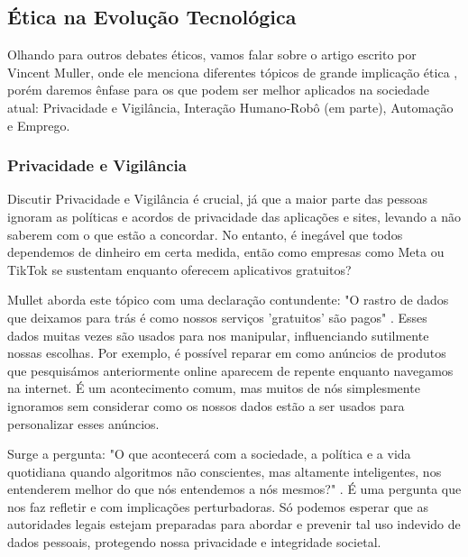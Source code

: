\documentclass[referee,sn-basic]{sn-jnl}
\theoremstyle{thmstyleone}%
\begin{document}
\subsection{Ética na Evolução Tecnológica}
\hspace{0.7cm}Olhando para outros debates éticos, vamos falar sobre o artigo escrito por Vincent Muller, onde ele menciona diferentes tópicos de grande implicação ética \cite{sep-ethics-ai}, porém daremos ênfase para os que podem ser melhor aplicados na sociedade atual: Privacidade e Vigilância, Interação Humano-Robô (em parte), Automação e Emprego.


\subsubsection{Privacidade e Vigilância}
\hspace{0.7cm}Discutir Privacidade e Vigilância é crucial, já que a maior parte das pessoas ignoram as políticas e acordos de privacidade das aplicações e sites, levando a não saberem com o que estão a concordar. No entanto, é inegável que todos dependemos de dinheiro em certa medida, então como empresas como Meta ou TikTok se sustentam enquanto oferecem aplicativos gratuitos?\par

 Mullet aborda este tópico com uma declaração contundente: "O rastro de dados que deixamos para trás é como nossos serviços 'gratuitos' são pagos" \cite{sep-ethics-ai}. Esses dados muitas vezes são usados para nos manipular, influenciando sutilmente nossas escolhas. Por exemplo, é possível reparar em como anúncios de produtos que pesquisámos anteriormente online aparecem de repente enquanto navegamos na internet. É um acontecimento comum, mas muitos de nós simplesmente ignoramos sem considerar como os nossos dados estão a ser usados para personalizar esses anúncios.\par

Surge a pergunta: "O que acontecerá com a sociedade, a política e a vida quotidiana quando algoritmos não conscientes, mas altamente inteligentes, nos entenderem melhor do que nós entendemos a nós mesmos?" \cite{sep-ethics-ai}. É uma pergunta que nos faz refletir e com implicações perturbadoras. Só podemos esperar que as autoridades legais estejam preparadas para abordar e prevenir tal uso indevido de dados pessoais, protegendo nossa privacidade e integridade societal.
\end{document}
